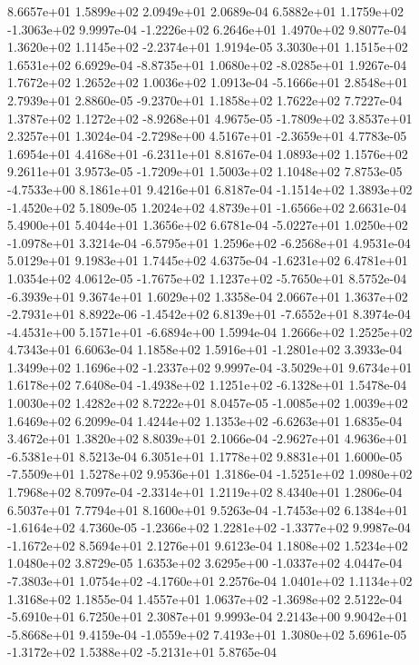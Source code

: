 8.6657e+01 1.5899e+02 2.0949e+01  2.0689e-04
 6.5882e+01  1.1759e+02 -1.3063e+02  9.9997e-04
-1.2226e+02  6.2646e+01  1.4970e+02  9.8077e-04
 1.3620e+02  1.1145e+02 -2.2374e+01  1.9194e-05
3.3030e+01 1.1515e+02 1.6531e+02  6.6929e-04
-8.8735e+01  1.0680e+02 -8.0285e+01  1.9267e-04
1.7672e+02 1.2652e+02 1.0036e+02  1.0913e-04
-5.1666e+01  2.8548e+01  2.7939e+01  2.8860e-05
-9.2370e+01  1.1858e+02  1.7622e+02  7.7227e-04
 1.3787e+02  1.1272e+02 -8.9268e+01  4.9675e-05
-1.7809e+02  3.8537e+01  2.3257e+01  1.3024e-04
-2.7298e+00  4.5167e+01 -2.3659e+01  4.7783e-05
 1.6954e+01  4.4168e+01 -6.2311e+01  8.8167e-04
1.0893e+02 1.1576e+02 9.2611e+01  3.9573e-05
-1.7209e+01  1.5003e+02  1.1048e+02  7.8753e-05
-4.7533e+00  8.1861e+01  9.4216e+01  6.8187e-04
-1.1514e+02  1.3893e+02 -1.4520e+02  5.1809e-05
 1.2024e+02  4.8739e+01 -1.6566e+02  2.6631e-04
5.4900e+01 5.4044e+01 1.3656e+02  6.6781e-04
-5.0227e+01  1.0250e+02 -1.0978e+01  3.3214e-04
-6.5795e+01  1.2596e+02 -6.2568e+01  4.9531e-04
5.0129e+01 9.1983e+01 1.7445e+02  4.6375e-04
-1.6231e+02  6.4781e+01  1.0354e+02  4.0612e-05
-1.7675e+02  1.1237e+02 -5.7650e+01  8.5752e-04
-6.3939e+01  9.3674e+01  1.6029e+02  1.3358e-04
 2.0667e+01  1.3637e+02 -2.7931e+01  8.8922e-06
-1.4542e+02  6.8139e+01 -7.6552e+01  8.3974e-04
-4.4531e+00  5.1571e+01 -6.6894e+00  1.5994e-04
1.2666e+02 1.2525e+02 4.7343e+01  6.6063e-04
 1.1858e+02  1.5916e+01 -1.2801e+02  3.3933e-04
 1.3499e+02  1.1696e+02 -1.2337e+02  9.9997e-04
-3.5029e+01  9.6734e+01  1.6178e+02  7.6408e-04
-1.4938e+02  1.1251e+02 -6.1328e+01  1.5478e-04
1.0030e+02 1.4282e+02 8.7222e+01  8.0457e-05
-1.0085e+02  1.0039e+02  1.6469e+02  6.2099e-04
 1.4244e+02  1.1353e+02 -6.6263e+01  1.6835e-04
3.4672e+01 1.3820e+02 8.8039e+01  2.1066e-04
-2.9627e+01  4.9636e+01 -6.5381e+01  8.5213e-04
6.3051e+01 1.1778e+02 9.8831e+01  1.6000e-05
-7.5509e+01  1.5278e+02  9.9536e+01  1.3186e-04
-1.5251e+02  1.0980e+02  1.7968e+02  8.7097e-04
-2.3314e+01  1.2119e+02  8.4340e+01  1.2806e-04
6.5037e+01 7.7794e+01 8.1600e+01  9.5263e-04
-1.7453e+02  6.1384e+01 -1.6164e+02  4.7360e-05
-1.2366e+02  1.2281e+02 -1.3377e+02  9.9987e-04
-1.1672e+02  8.5694e+01  2.1276e+01  9.6123e-04
1.1808e+02 1.5234e+02 1.0480e+02  3.8729e-05
 1.6353e+02  3.6295e+00 -1.0337e+02  4.0447e-04
-7.3803e+01  1.0754e+02 -4.1760e+01  2.2576e-04
1.0401e+02 1.1134e+02 1.3168e+02  1.1855e-04
 1.4557e+01  1.0637e+02 -1.3698e+02  2.5122e-04
-5.6910e+01  6.7250e+01  2.3087e+01  9.9993e-04
 2.2143e+00  9.9042e+01 -5.8668e+01  9.4159e-04
-1.0559e+02  7.4193e+01  1.3080e+02  5.6961e-05
-1.3172e+02  1.5388e+02 -5.2131e+01  5.8765e-04
